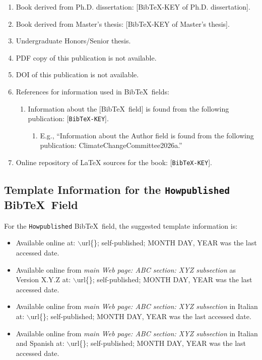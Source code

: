 \documentclass[letter,12pt]{article}
\begin{document}
\begin{enumerate}
\begin{enumerate}
	\end{enumerate}
\item Book derived from Ph.D. dissertation: [BibTeX-KEY of Ph.D. dissertation].
\item Book derived from Master's thesis: [BibTeX-KEY of Master's thesis].
\item Undergraduate Honors/Senior thesis.
\item PDF copy of this publication is not available.
\item DOI of this publication is not available.
\item References for information used in {\sc Bib}\TeX\ fields: \vspace{-0.3cm}
	\begin{enumerate} \itemsep -2pt
	\item Information about the [{\sc Bib}\TeX\ field] is found from the following publication: [{\tt BibTeX-KEY}]. \vspace{-0.2cm}
		\begin{enumerate} \itemsep -2pt
		\item E.g., ``Information about the Author field is found from the following publication: ClimateChangeCommittee2026a.''
		\end{enumerate}
	\end{enumerate}
\item Online repository of LaTeX sources for the book: [{\tt BibTeX-KEY}].
\end{enumerate}











\subsection{Template Information for the {\tt Howpublished} {\sc Bib}\TeX\ Field}
\label{ssec:TemplateInformationForTheHowpublishedBibTeXField}

For the {\tt Howpublished} {\sc Bib}\TeX\ field, the suggested template information is: \vspace{-0.3cm}
\begin{itemize} \itemsep -4pt
\item Available online at: $\backslash$url\{\}; self-published; MONTH DAY, YEAR was the last accessed date.
\item Available online from {\it main Web page: ABC section: XYZ subsection} as Version X.Y.Z at: $\backslash$url\{\}; self-published; MONTH DAY, YEAR was the last accessed date.
\item Available online from {\it main Web page: ABC section: XYZ subsection} in Italian at: $\backslash$url\{\}; self-published; MONTH DAY, YEAR was the last accessed date.
\item Available online from {\it main Web page: ABC section: XYZ subsection} in Italian and Spanish at: $\backslash$url\{\}; self-published; MONTH DAY, YEAR was the last accessed date.
\end{itemize}
\end{document}
